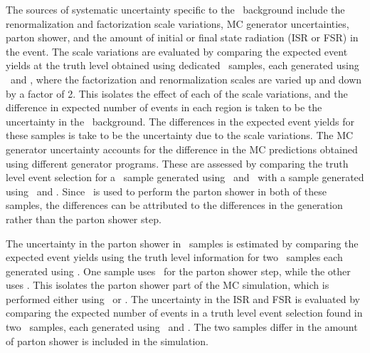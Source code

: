 The sources of systematic uncertainty specific to the \TTBAR\ background include
the renormalization and factorization scale variations, MC generator
uncertainties, parton shower, and the amount of initial or final state
radiation (ISR or FSR) in the event.
The scale variations are evaluated by comparing the expected event yields at the
truth level obtained using dedicated \TTBAR\ samples, each generated using
\powheg\ and \pythia, where the factorization and renormalization
scales are varied up and down by a factor of 2.
This isolates the effect of each of the scale variations, and the difference in
expected number of events in each region is taken to be the uncertainty in the
\TTBAR\ background.
The differences in the expected event yields for these samples is take to be
the uncertainty due to the scale variations.
The MC generator uncertainty accounts for the difference in the MC predictions
obtained using different generator programs.
These are assessed by comparing the truth level event selection for a
\TTBAR\ sample generated using \powheg\ and \jimmy\ with a sample
generated using \mcnlo\ and \jimmy.
Since \jimmy\ is used to perform the parton shower in both of these
samples, the differences can be attributed to the differences in the
generation rather than the parton shower step.

The uncertainty in the parton shower in \TTBAR\ samples is estimated by
comparing the expected event yields using the truth level information for two
\TTBAR\ samples each generated using \powheg.
One sample uses \pythia\ for the parton shower step, while the other
uses \jimmy.
This isolates the parton shower part of the MC simulation, which is performed
either using \pythia\ or \jimmy.
The uncertainty in the ISR and FSR is evaluated by comparing the expected number
of events in a truth level event selection found in two \TTBAR\ samples, each
generated using \acermc\ and \pythia.
The two samples differ in the amount of parton shower is included in the
simulation.

